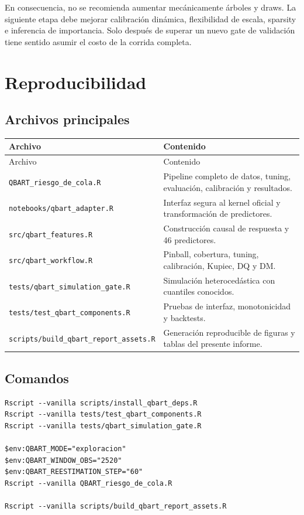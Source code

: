 \documentclass[11pt,a4paper]{article}
\begin{document}
En consecuencia, no se recomienda aumentar mecánicamente árboles y draws.
La siguiente etapa debe mejorar calibración dinámica, flexibilidad de escala,
sparsity e inferencia de importancia. Solo después de superar un nuevo gate
de validación tiene sentido asumir el costo de la corrida completa.

\appendix

\section{Reproducibilidad}

\subsection{Archivos principales}

\begin{longtable}{p{}p{}}
\toprule
Archivo & Contenido \\
\midrule
\endfirsthead
\toprule
Archivo & Contenido \\
\midrule
\endhead
\texttt{QBART\_riesgo\_de\_cola.R} &
Pipeline completo de datos, tuning, evaluación, calibración y resultados. \\
\texttt{notebooks/qbart\_adapter.R} &
Interfaz segura al kernel oficial y transformación de predictores. \\
\texttt{src/qbart\_features.R} &
Construcción causal de respuesta y 46 predictores. \\
\texttt{src/qbart\_workflow.R} &
Pinball, cobertura, tuning, calibración, Kupiec, DQ y DM. \\
\texttt{tests/qbart\_simulation\_gate.R} &
Simulación heterocedástica con cuantiles conocidos. \\
\texttt{tests/test\_qbart\_components.R} &
Pruebas de interfaz, monotonicidad y backtests. \\
\texttt{scripts/}\newline\texttt{build\_qbart\_report\_assets.R} &
Generación reproducible de figuras y tablas del presente informe. \\
\bottomrule
\end{longtable}

\subsection{Comandos}

\begin{verbatim}
Rscript --vanilla scripts/install_qbart_deps.R
Rscript --vanilla tests/test_qbart_components.R
Rscript --vanilla tests/qbart_simulation_gate.R

$env:QBART_MODE="exploracion"
$env:QBART_WINDOW_OBS="2520"
$env:QBART_REESTIMATION_STEP="60"
Rscript --vanilla QBART_riesgo_de_cola.R

Rscript --vanilla scripts/build_qbart_report_assets.R
\end{verbatim}
\end{document}
